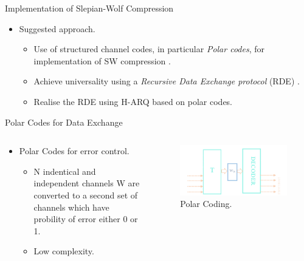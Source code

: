 \documentclass[final,hyperref={pdfpagelabels=false}]{beamer}
\begin{document}
\begin{frame}[t]
\begin{columns}[t]
\begin{column}{.465\textwidth}
\begin{block}{Implementation of Slepian-Wolf Compression }
\begin{itemize}
\item Suggested approach.
\begin{itemize}
\item Use of structured channel codes, in particular \emph{Polar codes}, for implementation of SW compression \cite{PCSW}.
\item Achieve universality using a \emph{Recursive Data Exchange protocol} (RDE)   
 \cite{HTRDE}.
\item Realise the RDE using H-ARQ based on polar codes. 
\end{itemize}
\end{itemize}

\end{block}

\begin{block}{Polar Codes for Data Exchange}
\vspace{0.5cm}
\begin{columns} %
\begin{column}{.5\textwidth} %

\begin{itemize}
\item Polar Codes for error control.
\begin{itemize}
\item N indentical and independent channels W are converted to a second set of channels which have probility of error either 0 or 1.
\item Low complexity.
\end{itemize}
\end{itemize}
\end{column}

\begin{column}{.43\textwidth} %
\centering
\begin{figure}
\includegraphics[width=1\linewidth]{pch.png}
\caption{Polar Coding.}
\end{figure}
\end{column}
\end{columns} %


\end{block}
\end{column}
\end{columns}
\end{frame}
\end{document}
